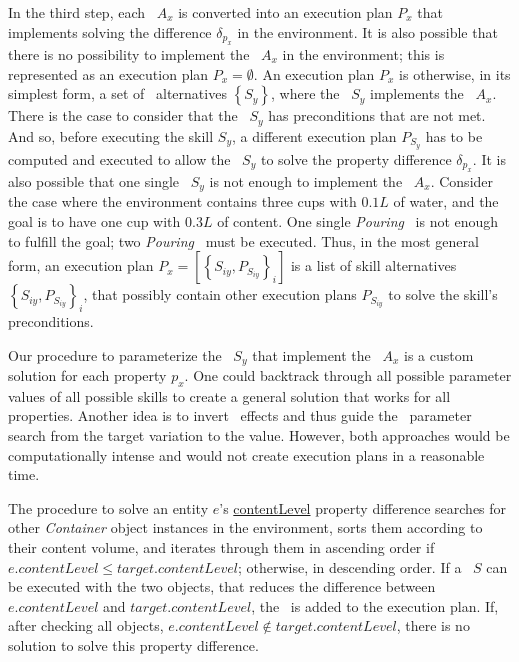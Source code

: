 In the third step, each \action\ $A_x$ is converted into an execution plan $P_x$ that implements solving the difference $\delta_{p_x}$ in the environment. It is also possible that there is no possibility to implement the \action\ $A_x$ in the environment; this is represented as an execution plan $P_x = \emptyset$. An execution plan $P_x$ is otherwise, in its simplest form, a set of \skill\ alternatives $\left\{S_y\right\}$, where the \skill\ $S_y$ implements the \action\ $A_x$. There is the case to consider that the \skill\ $S_y$ has preconditions that are not met. And so, before executing the skill $S_y$, a different execution plan $P_{S_y}$ has to be computed and executed to allow the \skill\ $S_y$ to solve the property difference $\delta_{p_x}$. It is also possible that one single \skill\  $S_y$ is not enough to implement the \action\ $A_x$. Consider the case where the environment contains three cups with $0.1L$ of water, and the goal is to have one cup with $0.3L$ of content. One single \textit{Pouring} \skill\ is not enough to fulfill the goal; two \textit{Pouring} \skills\ must be executed. Thus, in the most general form, an execution plan $P_x = \left[\left\{ S_{iy}, P_{S_{iy}} \right\}_i\right]$ is a list of skill alternatives $\left\{ S_{iy}, P_{S_{iy}} \right\}_i$, that possibly contain other execution plans $P_{S_{iy}}$ to solve the skill's preconditions.

Our procedure to parameterize the \skills\ $S_y$ that implement the \action\ $A_x$ is a custom solution for each property $p_x$. One could backtrack through all possible parameter values of all possible skills to create a general solution that works for all properties. Another idea is to invert \skill\ effects and thus guide the \skill\ parameter search from the target variation to the value. However, both approaches would be computationally intense and would not create execution plans in a reasonable time. 

The procedure to solve an entity $e$'s \underline{contentLevel} property difference searches for other \textit{Container} object instances in the environment, sorts them according to their content volume, and iterates through them in ascending order if $e.contentLevel \le target.contentLevel$; otherwise, in descending order. If a \skill\ $S$ can be executed with the two objects, that reduces the difference between $e.contentLevel$ and $target.contentLevel$, the \skill\ is added to the execution plan. If, after checking all objects, $e.contentLevel \not\in target.contentLevel$, there is no solution to solve this property difference.


